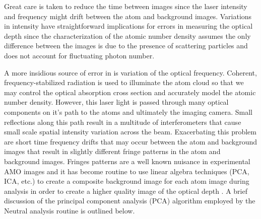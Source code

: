 Great care is taken to reduce the time between images since the laser intensity and frequency might drift between the atom and background images. 
Variations in intensity have straightforward implications for errors in measuring the optical depth since the characterization of the atomic number density assumes the only difference between the images is due to the presence of scattering particles and does not account for fluctuating photon number. 

A more insidious source of error in is variation of the optical frequency. 
Coherent, frequency-stabilized radiation is used to illuminate the atom cloud so that we may control the optical absorption cross section and accurately model the atomic number density. 
However, this laser light is passed through many optical components on it's path to the atoms and ultimately the imaging camera. 
Small reflections along this path result in a multitude of interferometers that cause small scale spatial intensity variation across the beam. 
Exacerbating this problem are short time frequency drifts that may occur between the atom and background images that result in slightly different fringe patterns in the atom and background images. 
Fringes patterns are a well known nuisance in experimental AMO images and it has become routine to use linear algebra techniques (PCA, ICA, etc.) to create a composite background image for each atom image during analysis in order to create a higher quality image of the optical depth \cite{Segal2009}.
A brief discussion of the principal component analysis (PCA) algorithm employed by the Neutral analysis routine is outlined below.

